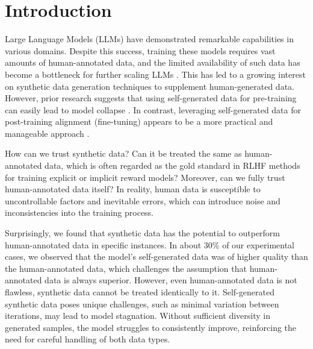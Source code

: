 \section{Introduction}
Large Language Models (LLMs) have demonstrated remarkable capabilities in various domains. Despite this success, training these models requires vast amounts of human-annotated data, and the limited availability of such data has become a bottleneck for further scaling LLMs \citep{kaplan2020scaling, villalobos2024rundatalimitsllm}. 
This has led to a growing interest on synthetic data generation techniques to supplement human-generated data. 
However, prior research suggests that using self-generated data for pre-training can easily lead to model collapse \citep{shumailov2024ai}. In contrast, leveraging self-generated data for post-training alignment (fine-tuning) appears to be a more practical and manageable approach \citep{chen2024selfplayfinetuningconvertsweak, alami2024investigatingregularizationselfplaylanguage}.

How can we trust synthetic data? Can it be treated the same as human-annotated data, which is often regarded as the gold standard in RLHF methods for training explicit or implicit reward models? Moreover, can we fully trust human-annotated data itself? In reality, human data is susceptible to uncontrollable factors and inevitable errors, which can introduce noise and inconsistencies into the training process.

Surprisingly, we found that synthetic data has the potential to outperform human-annotated data in specific instances. In about 30\% of our experimental cases, we observed that the model’s self-generated data was of higher quality than the human-annotated data, which challenges the assumption that human-annotated data is always superior. However, even human-annotated data is not flawless, synthetic data cannot be treated identically to it. Self-generated synthetic data poses unique challenges, such as minimal variation between iterations, may lead to model stagnation. Without sufficient diversity in generated samples, the model struggles to consistently improve, reinforcing the need for careful handling of both data types.

